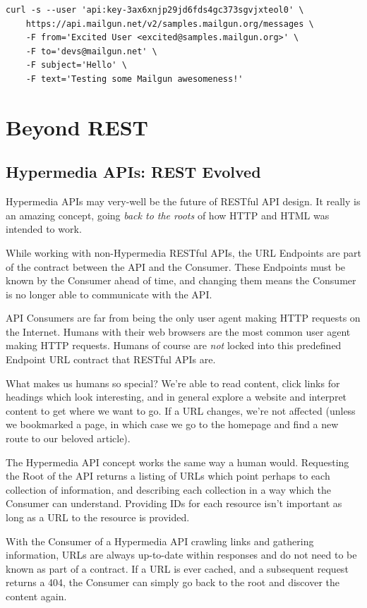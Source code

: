 \documentclass{book}
\begin{document}
\begin{verbatim}
curl -s --user 'api:key-3ax6xnjp29jd6fds4gc373sgvjxteol0' \
    https://api.mailgun.net/v2/samples.mailgun.org/messages \
    -F from='Excited User <excited@samples.mailgun.org>' \
    -F to='devs@mailgun.net' \
    -F subject='Hello' \
    -F text='Testing some Mailgun awesomeness!'
\end{verbatim}


\chapter{Beyond REST}

\section{Hypermedia APIs: REST Evolved}

Hypermedia APIs may very-well be the future of RESTful API design. It really is an amazing concept, going \emph{back to the roots} of how HTTP and HTML was intended to work.

While working with non-Hypermedia RESTful APIs, the URL Endpoints are part of the contract between the API and the Consumer. These Endpoints must be known by the Consumer ahead of time, and changing them means the Consumer is no longer able to communicate with the API.

API Consumers are far from being the only user agent making HTTP requests on the Internet. Humans with their web browsers are the most common user agent making HTTP requests. Humans of course are \emph{not} locked into this predefined Endpoint URL contract that RESTful APIs are.

What makes us humans so special? We're able to read content, click links for headings which look interesting, and in general explore a website and interpret content to get where we want to go. If a URL changes, we're not affected (unless we bookmarked a page, in which case we go to the homepage and find a new route to our beloved article).

The Hypermedia API concept works the same way a human would. Requesting the Root of the API returns a listing of URLs which point perhaps to each collection of information, and describing each collection in a way which the Consumer can understand. Providing IDs for each resource isn't important as long as a URL to the resource is provided.

With the Consumer of a Hypermedia API crawling links and gathering information, URLs are always up-to-date within responses and do not need to be known as part of a contract. If a URL is ever cached, and a subsequent request returns a 404, the Consumer can simply go back to the root and discover the content again.
\end{document}
